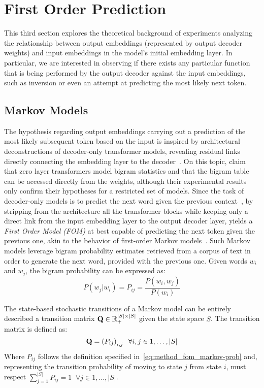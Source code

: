 \section{First Order Prediction}\label{sec:method_fom}

This third section explores the theoretical background of experiments analyzing the relationship between output embeddings (represented by output decoder weights) and input embeddings in the model's initial embedding layer.
In particular, we are interested in observing if there exists any particular function that is being performed by the output decoder against the input embeddings, such as inversion or even an attempt at predicting the most likely next token.

\subsection{Markov Models}

The hypothesis regarding output embeddings carrying out a prediction of the most likely subsequent token based on the input is inspired by architectural deconstructions of decoder-only transformer models, revealing residual links directly connecting the embedding layer to the decoder~\cite{vaswani2017}.
On this topic, \citet{elhage2021} claim that zero layer transformers model bigram statistics and that the bigram table can be accessed directly from the weights, although their experimental results only confirm their hypotheses for a restricted set of models.
Since the task of decoder-only models is to predict the next word given the previous context~\cite{radford2019}, by stripping from the architecture all the transformer blocks while keeping only a direct link from the input embedding layer to the output decoder layer, yields a \emph{First Order Model (FOM)} at best capable of predicting the next token given the previous one, akin to the behavior of first-order Markov models~\cite{markov2006}.
Such Markov models leverage bigram probability estimates retrieved from a corpus of text in order to generate the next word, provided with the previous one.
Given words $w_i$ and $w_j$, the bigram probability can be expressed as:
\begin{equation}
    \label{eq:method_fom_markov-prob}
    P(w_j|w_i) = P_{ij} = \frac{P(w_i, w_j)}{P(w_i)}
\end{equation}

The state-based stochastic transitions of a Markov model can be entirely described  a transition matrix $\bm{\mathbf{Q}} \in \mathbb {R}_{+}^{|S| \times |S|}$ given the state space $S$.
The transition matrix is defined as:
\begin{equation*}
    \bm{\mathbf{Q}} = \left(P_{ij}\right)_{i,j} \;\; \forall i,j \in 1,\dots,|S|
\end{equation*}
Where $P_{ij}$ follows the definition specified in~\cref{eq:method_fom_markov-prob} and, representing the transition probability of moving to state $j$ from state $i$, must respect $\sum_{j=1}^{|S|}{P_{ij}} = 1 \;\; \forall j \in 1,\dots,|S|$.


